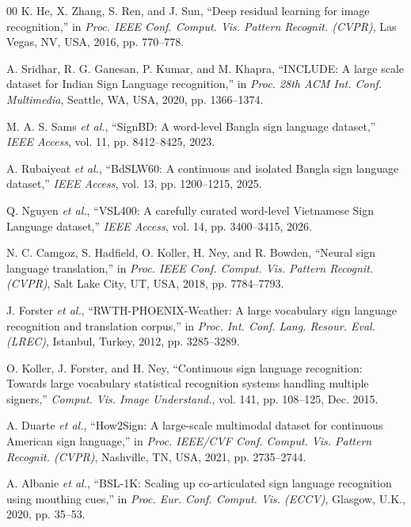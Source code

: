 \documentclass{ieeeaccess}
\begin{document}
\begin{thebibliography}{00}
K. He, X. Zhang, S. Ren, and J. Sun, ``Deep residual learning for image recognition,'' in \emph{Proc. IEEE Conf. Comput. Vis. Pattern Recognit. (CVPR)}, Las Vegas, NV, USA, 2016, pp. 770--778.

A. Sridhar, R. G. Ganesan, P. Kumar, and M. Khapra, ``INCLUDE: A large scale dataset for Indian Sign Language recognition,'' in \emph{Proc. 28th ACM Int. Conf. Multimedia}, Seattle, WA, USA, 2020, pp. 1366--1374.

M. A. S. Sams \emph{et al.}, ``SignBD: A word-level Bangla sign language dataset,'' \emph{IEEE Access}, vol. 11, pp. 8412--8425, 2023.

A. Rubaiyeat \emph{et al.}, ``BdSLW60: A continuous and isolated Bangla sign language dataset,'' \emph{IEEE Access}, vol. 13, pp. 1200--1215, 2025.

Q. Nguyen \emph{et al.}, ``VSL400: A carefully curated word-level Vietnamese Sign Language dataset,'' \emph{IEEE Access}, vol. 14, pp. 3400--3415, 2026.

N. C. Camgoz, S. Hadfield, O. Koller, H. Ney, and R. Bowden, ``Neural sign language translation,'' in \emph{Proc. IEEE Conf. Comput. Vis. Pattern Recognit. (CVPR)}, Salt Lake City, UT, USA, 2018, pp. 7784--7793.

J. Forster \emph{et al.}, ``RWTH-PHOENIX-Weather: A large vocabulary sign language recognition and translation corpus,'' in \emph{Proc. Int. Conf. Lang. Resour. Eval. (LREC)}, Istanbul, Turkey, 2012, pp. 3285--3289.

O. Koller, J. Forster, and H. Ney, ``Continuous sign language recognition: Towards large vocabulary statistical recognition systems handling multiple signers,'' \emph{Comput. Vis. Image Understand.}, vol. 141, pp. 108--125, Dec. 2015.

A. Duarte \emph{et al.}, ``How2Sign: A large-scale multimodal dataset for continuous American sign language,'' in \emph{Proc. IEEE/CVF Conf. Comput. Vis. Pattern Recognit. (CVPR)}, Nashville, TN, USA, 2021, pp. 2735--2744.

A. Albanie \emph{et al.}, ``BSL-1K: Scaling up co-articulated sign language recognition using mouthing cues,'' in \emph{Proc. Eur. Conf. Comput. Vis. (ECCV)}, Glasgow, U.K., 2020, pp. 35--53.


\end{thebibliography}
\end{document}
